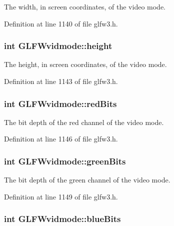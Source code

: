 The width, in screen coordinates, of the video mode. 

Definition at line 1140 of file glfw3.h.\hypertarget{struct_g_l_f_wvidmode_c65942a5f6981695517437a9d571d03c}{
\subsubsection[height]{\setlength{\rightskip}{0pt plus 5cm}int {\bf GLFWvidmode::height}}}
\label{struct_g_l_f_wvidmode_c65942a5f6981695517437a9d571d03c}


The height, in screen coordinates, of the video mode. 

Definition at line 1143 of file glfw3.h.\hypertarget{struct_g_l_f_wvidmode_6066c4ecd251098700062d3b735dba1b}{
\subsubsection[redBits]{\setlength{\rightskip}{0pt plus 5cm}int {\bf GLFWvidmode::redBits}}}
\label{struct_g_l_f_wvidmode_6066c4ecd251098700062d3b735dba1b}


The bit depth of the red channel of the video mode. 

Definition at line 1146 of file glfw3.h.\hypertarget{struct_g_l_f_wvidmode_292fdd281f3485fb3ff102a5bda43faa}{
\subsubsection[greenBits]{\setlength{\rightskip}{0pt plus 5cm}int {\bf GLFWvidmode::greenBits}}}
\label{struct_g_l_f_wvidmode_292fdd281f3485fb3ff102a5bda43faa}


The bit depth of the green channel of the video mode. 

Definition at line 1149 of file glfw3.h.\hypertarget{struct_g_l_f_wvidmode_f310977f58d2e3b188175b6e3d314047}{
\subsubsection[blueBits]{\setlength{\rightskip}{0pt plus 5cm}int {\bf GLFWvidmode::blueBits}}}
\label{struct_g_l_f_wvidmode_f310977f58d2e3b188175b6e3d314047}


